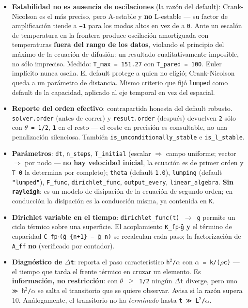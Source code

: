 \documentclass[11pt,letterpaper,oneside]{report}
\begin{document}
\begin{itemize}
  \item \textbf{Estabilidad no es ausencia de oscilaciones} (la razón del default): Crank-Nicolson es el más preciso, pero A-estable y \textbf{no} L-estable --- su factor de amplificación tiende a \texttt{−1} para los modos altos en vez de a \texttt{0}. Ante un escalón de temperatura en la frontera produce oscilación amortiguada con temperaturas \textbf{fuera del rango de los datos}, violando el principio del máximo de la ecuación de difusión: un resultado cualitativamente imposible, no sólo impreciso. Medido: \texttt{T\_max = 151.27} con \texttt{T\_pared = 100}. Euler implícito nunca oscila. El default protege a quien no eligió; Crank-Nicolson queda a un parámetro de distancia. Mismo criterio que fijó \texttt{lumped} como default de la capacidad, aplicado al eje temporal en vez del espacial.
  \item \textbf{Reporte del orden efectivo}: contrapartida honesta del default robusto. \texttt{solver.order} (antes de correr) y \texttt{result.order} (después) devuelven \texttt{2} sólo con \texttt{\ensuremath{\theta} = 1/2}, \texttt{1} en el resto --- el coste en precisión es consultable, no una penalización silenciosa. También \texttt{is\_unconditionally\_stable} e \texttt{is\_l\_stable}.
  \item \textbf{Parámetros}: \texttt{dt}, \texttt{n\_steps}, \texttt{T\_initial} (escalar \ensuremath{\Rightarrow} campo uniforme; vector \ensuremath{\Rightarrow} por nodo --- \textbf{no hay velocidad inicial}, la ecuación es de primer orden y \texttt{T\_0} la determina por completo); \texttt{theta} (default \texttt{1.0}), \texttt{lumping} (default \texttt{"lumped"}), \texttt{F\_func}, \texttt{dirichlet\_func}, \texttt{output\_every}, \texttt{linear\_algebra}. \textbf{Sin \texttt{rayleigh}}: es un modelo de disipación de la ecuación de segundo orden; en conducción la disipación es la conducción misma, ya contenida en \texttt{K}.
  \item \textbf{Dirichlet variable en el tiempo}: \texttt{dirichlet\_func(t) \ensuremath{\to} g} permite un ciclo térmico sobre una superficie. El acoplamiento \texttt{K\_fp\ensuremath{\cdot}ḡ} \textbf{y} el término de capacidad \texttt{C\_fp\ensuremath{\cdot}(ḡ\_\{n+1\} − ḡ\_n)} se recalculan cada paso; la factorización de \texttt{A\_ff} \textbf{no} (verificado por contador).
  \item \textbf{Diagnóstico de \texttt{\ensuremath{\Delta}t}}: reporta el paso característico \texttt{h\ensuremath{^{2}}/\ensuremath{\alpha}} con \texttt{\ensuremath{\alpha} = k/(\ensuremath{\rho}c)} --- el tiempo que tarda el frente térmico en cruzar un elemento. Es \textbf{información, no restricción}: con \texttt{\ensuremath{\theta} \ensuremath{\ge} 1/2} ningún \texttt{\ensuremath{\Delta}t} diverge, pero uno \texttt{≫ h\ensuremath{^{2}}/\ensuremath{\alpha}} se salta el transitorio que se quiere observar. Avisa si la razón supera 10. Análogamente, el transitorio no ha \textit{terminado} hasta \texttt{t ≫ L\ensuremath{^{2}}/\ensuremath{\alpha}}.

\end{itemize}
\end{document}
